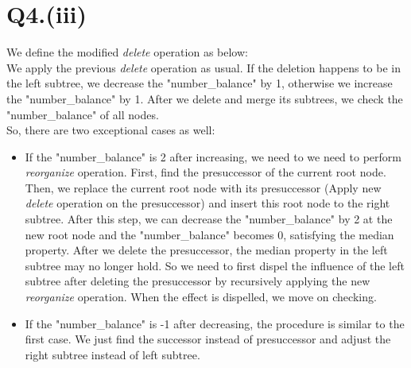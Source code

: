 \documentclass{article}
\begin{document}
\section*{Q4.(iii)}
    We define the modified \emph{delete} operation as below:\\
    We apply the previous \emph{delete} operation as usual. If the deletion happens to be in the left subtree, we decrease the
    "number\_balance" by 1, otherwise we increase the "number\_balance" by 1. After we delete and merge its subtrees, we check the 
    "number\_balance" of all nodes.\\
    So, there are two exceptional cases as well:
\begin{itemize}
    \item If the "number\_balance" is 2 after increasing, we need to we need to perform \emph{reorganize} operation. First, find the presuccessor 
          of the current root node. Then, we replace the current root node with its presuccessor (Apply new \emph{delete} operation on the 
          presuccessor) and insert this root node to the right subtree. After this step, we can decrease the "number\_balance" by 2 at the new 
          root node and the "number\_balance" becomes 0, satisfying the median property. After we delete the presuccessor, the median property 
          in the left subtree may no longer hold. So we need to first dispel the influence of the left subtree after deleting the presuccessor 
          by recursively applying the new \emph{reorganize} operation. When the effect is dispelled, we move on checking.
    \item If the "number\_balance" is -1 after decreasing, the procedure is similar to the first case. We just find the successor instead of 
          presuccessor and adjust the right subtree instead of left subtree.
\end{itemize}
\end{document}
